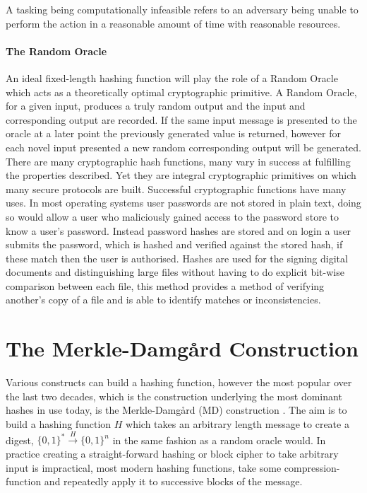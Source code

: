 \documentclass[a4paper,12pt]{article}
\begin{document}
A tasking being computationally infeasible refers to an adversary being unable to perform the action in a reasonable amount of time with reasonable resources.

\label{sec:propeties_of_a_hash}

\paragraph{The Random Oracle} An ideal fixed-length hashing function will play the role of a Random Oracle which  acts as a theoretically optimal cryptographic primitive. A Random Oracle, for a given input, produces a truly random output and the input and corresponding output are recorded. If the same input message is presented to the oracle at a later point the previously generated value is returned, however for each novel input presented a new random corresponding output will be generated.\\



There are many cryptographic hash functions, many vary in success at fulfilling the properties described. Yet they are integral cryptographic primitives on which many secure protocols are built. Successful cryptographic functions have many uses. In most operating systems user passwords are not stored in plain text, doing so would allow a user who maliciously gained access to the password store to know a user's password. Instead password hashes are stored and on login a user submits the password, which is hashed and verified against the stored hash, if these match then the user is authorised. Hashes are used for the signing digital documents and distinguishing large files without having to do explicit bit-wise comparison between each file, this method provides a method of verifying another's copy of a file and is able to identify matches or inconsistencies.

\section{The Merkle-Damg\r{a}rd Construction}
Various constructs can build a hashing function, however the most popular over the last two decades, which is the construction underlying the most dominant hashes in use today, is the Merkle-Damg\r{a}rd (MD) construction \cite{Merkle1979}.
The aim is to build a hashing function $H$ which takes an arbitrary length message to create a digest, $\{0,1\}^* \xrightarrow{H} \{0,1\}^n$ in the same fashion as a random oracle would. In practice creating a straight-forward hashing or block cipher to take arbitrary input is impractical, most modern hashing functions, take some compression-function and repeatedly apply it to successive blocks of the message.
\end{document}
